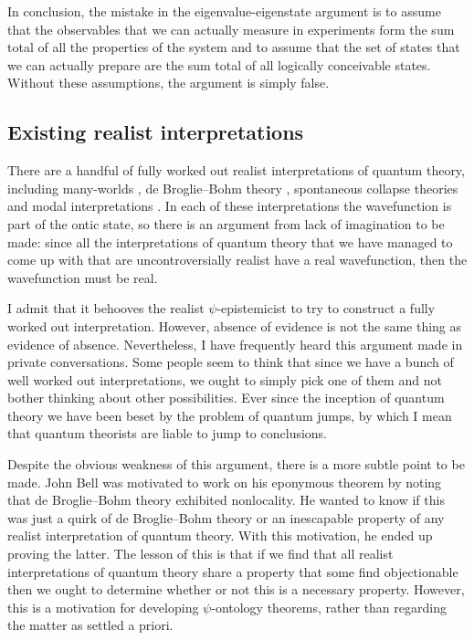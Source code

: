 \documentclass[DIV=calc,fontsize=12pt]{scrartcl} %
\theoremstyle{definition}
\theoremstyle{plain}
\begin{document}
In conclusion, the mistake in the eigenvalue-eigenstate argument is to
assume that the observables that we can actually measure in
experiments form the sum total of all the properties of the system and
to assume that the set of states that we can actually prepare are the
sum total of all logically conceivable states.  Without these
assumptions, the argument is simply false.

\subsection{Existing realist interpretations}

\label{ERI}

There are a handful of fully worked out realist interpretations of
quantum theory, including many-worlds \cite{Everett1957, DeWitt1973,
Wallace2012}, de Broglie--Bohm theory \cite{Broglie2009, Bohm1952,
Bohm1952a, Duerr2009}, spontaneous collapse theories
\cite{Ghirardi1986, Bassi2013} and modal interpretations
\cite{Lombardi2013}.  In each of these interpretations the
wavefunction is part of the ontic state, so there is an argument from
lack of imagination to be made: since all the interpretations of
quantum theory that we have managed to come up with that are
uncontroversially realist have a real wavefunction, then the
wavefunction must be real.

I admit that it behooves the realist $\psi$-epistemicist to try to
construct a fully worked out interpretation.  However, absence of
evidence is not the same thing as evidence of absence.  Nevertheless,
I have frequently heard this argument made in private conversations.
Some people seem to think that since we have a bunch of well worked
out interpretations, we ought to simply pick one of them and not
bother thinking about other possibilities.  Ever since the inception
of quantum theory we have been beset by the problem of quantum jumps,
by which I mean that quantum theorists are liable to jump to
conclusions.

Despite the obvious weakness of this argument, there is a more subtle
point to be made.  John Bell was motivated to work on his eponymous
theorem by noting that de Broglie--Bohm theory exhibited nonlocality.
He wanted to know if this was just a quirk of de Broglie--Bohm theory
or an inescapable property of any realist interpretation of quantum
theory.  With this motivation, he ended up proving the latter.  The
lesson of this is that if we find that all realist interpretations of
quantum theory share a property that some find objectionable then we
ought to determine whether or not this is a necessary property.
However, this is a motivation for developing $\psi$-ontology theorems,
rather than regarding the matter as settled a priori.
\end{document}
